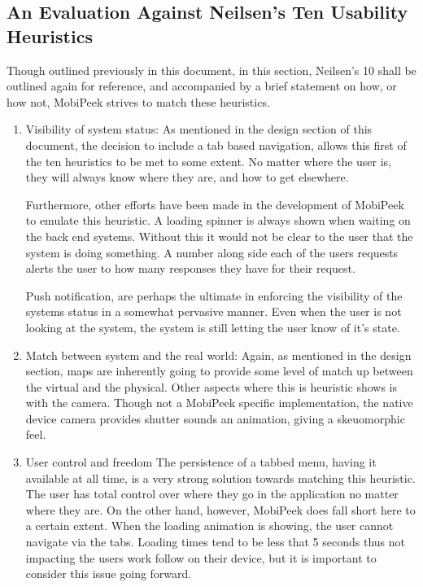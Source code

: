 \documentclass[a4paper]{article}
\begin{document}
\subsection{An Evaluation Against Neilsen's Ten Usability Heuristics}
Though outlined previously in this document, in this section, Neilsen's 10 \cite{Nielsen} shall be outlined again for reference, and accompanied by a brief statement on how, or how not, MobiPeek strives to match these heuristics. 


\begin{enumerate}
\item Visibility of system status:
As mentioned in the design section of this document, the decision to include a tab based navigation, allows this first of the ten heuristics to be met to some extent. No matter where the user is, they will always know where they are, and how to get elsewhere.

Furthermore, other efforts have been made in the development of MobiPeek to emulate this heuristic. A loading spinner is always shown when waiting on the back end systems. Without this it would not be clear to the user that the system is doing something. A number along side each of the users requests alerts the user to how many responses they have for their request.

Push notification, are perhaps the ultimate in enforcing the visibility of the systems status in a somewhat pervasive manner. Even when the user is not looking at the system, the system is still letting the user know of it's state.

\item Match between system and the real world: 
Again, as mentioned in the design section, maps are inherently going to provide some level of match up between the virtual and the physical. Other aspects where this is heuristic shows is with the camera. Though not a MobiPeek specific implementation, the native device camera provides shutter sounds an animation, giving a skeuomorphic feel. 
 
\item User control and freedom
The persistence of a tabbed menu, having it available at all time, is a very strong solution towards matching this heuristic. The user has total control over where they go in the application no matter where they are. On the other hand, however, MobiPeek does fall short here to a certain extent. When the loading animation is showing, the user cannot navigate via the tabs. Loading times tend to be less that 5 seconds thus not impacting the users work follow on their device, but it is important to consider this issue going forward.


\end{enumerate}
\end{document}
